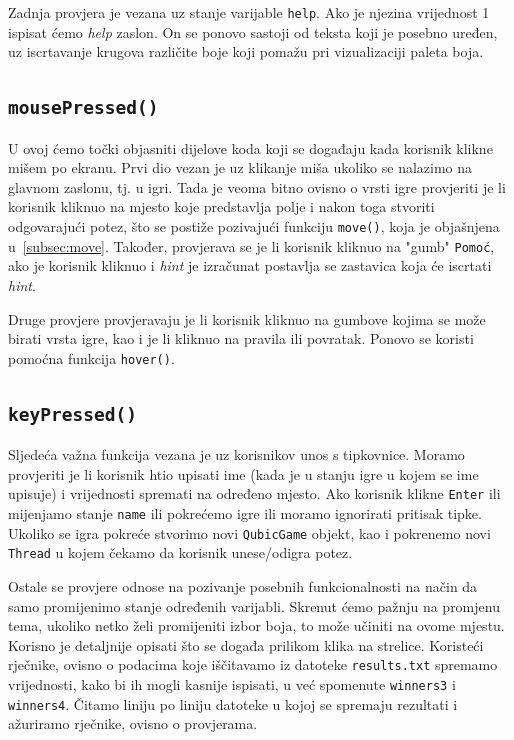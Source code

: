 \documentclass[12pt]{scrartcl}
\begin{document}
Zadnja provjera je vezana uz stanje varijable \texttt{help}. Ako je njezina vrijednost 1 ispisat ćemo \emph{help} zaslon. On se ponovo sastoji od teksta koji je posebno uređen, uz iscrtavanje krugova različite boje koji pomažu pri vizualizaciji paleta boja.

\subsection{\texttt{mousePressed()}}
U ovoj ćemo točki objasniti dijelove koda koji se događaju kada korisnik klikne mišem po ekranu. Prvi dio vezan je uz klikanje miša ukoliko se nalazimo na glavnom zaslonu, tj. u igri. Tada je veoma bitno ovisno o vrsti igre provjeriti je li korisnik kliknuo na mjesto koje predstavlja polje i nakon toga stvoriti odgovarajući potez, što se postiže pozivajući funkciju \texttt{move()}, koja je objašnjena u~\ref{subsec:move}. Također, provjerava se je li korisnik kliknuo na "gumb" \texttt{Pomoć}, ako je korisnik kliknuo i \emph{hint} je izračunat postavlja se zastavica koja će iscrtati \emph{hint}.

Druge provjere provjeravaju je li korisnik kliknuo na gumbove kojima se može birati vrsta igre, kao i je li kliknuo na pravila ili povratak. Ponovo se koristi pomoćna funkcija \texttt{hover()}.

\subsection{\texttt{keyPressed()}}
Sljedeća važna funkcija vezana je uz korisnikov unos s tipkovnice. Moramo provjeriti je li korisnik htio upisati ime (kada je u stanju igre u kojem se ime upisuje) i vrijednosti spremati na određeno mjesto. Ako korisnik klikne \texttt{Enter} ili mijenjamo stanje \texttt{name} ili pokrećemo igre ili moramo ignorirati pritisak tipke. Ukoliko se igra pokreće stvorimo novi \texttt{QubicGame} objekt, kao i pokrenemo novi \texttt{Thread} u kojem čekamo da korisnik unese/odigra potez.

Ostale se provjere odnose na pozivanje posebnih funkcionalnosti na način da samo promijenimo stanje određenih varijabli. Skrenut ćemo pažnju na promjenu tema, ukoliko netko želi promijeniti izbor boja, to može učiniti na ovome mjestu. Korisno je detaljnije opisati što se događa prilikom klika na strelice. Koristeći rječnike, ovisno o podacima koje iščitavamo iz datoteke \texttt{results.txt} spremamo vrijednosti, kako bi ih mogli kasnije ispisati, u već spomenute \texttt{winners3} i \texttt{winners4}. Čitamo liniju po liniju datoteke u kojoj se spremaju rezultati i ažuriramo rječnike, ovisno o provjerama. 
\end{document}
